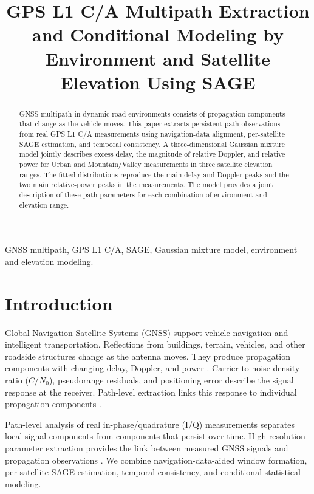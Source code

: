 \documentclass[conference]{IEEEtran}
\title{GPS L1 C/A Multipath Extraction and Conditional Modeling by Environment and Satellite Elevation Using SAGE}
\author{\IEEEauthorblockN{Liang Feng}
\IEEEauthorblockA{Tongji University, Shanghai, China\\2432132@tongji.edu.cn}}
\begin{document}
\maketitle

\begin{abstract}
GNSS multipath in dynamic road environments consists of propagation components that change as the vehicle moves. This paper extracts persistent path observations from real GPS L1 C/A measurements using navigation-data alignment, per-satellite SAGE estimation, and temporal consistency. A three-dimensional Gaussian mixture model jointly describes excess delay, the magnitude of relative Doppler, and relative power for Urban and Mountain/Valley measurements in three satellite elevation ranges. The fitted distributions reproduce the main delay and Doppler peaks and the two main relative-power peaks in the measurements. The model provides a joint description of these path parameters for each combination of environment and elevation range.
\end{abstract}

\begin{IEEEkeywords}
GNSS multipath, GPS L1 C/A, SAGE, Gaussian mixture model, environment and elevation modeling.
\end{IEEEkeywords}

\section{Introduction}
Global Navigation Satellite Systems (GNSS) support vehicle navigation and intelligent transportation. Reflections from buildings, terrain, vehicles, and other roadside structures change as the antenna moves. They produce propagation components with changing delay, Doppler, and power \cite{eissfeller1996gpsdynamic,mora1998multipath,beitler2015cmcd}. Carrier-to-noise-density ratio ($C/N_0$), pseudorange residuals, and positioning error describe the signal response at the receiver. Path-level extraction links this response to individual propagation components \cite{bilich2007snr,xie2011vehicular,beitler2015cmcd}.

Path-level analysis of real in-phase/quadrature (I/Q) measurements separates local signal components from components that persist over time. High-resolution parameter extraction provides the link between measured GNSS signals and propagation observations \cite{fleury1999sage}. We combine navigation-data-aided window formation, per-satellite SAGE estimation, temporal consistency, and conditional statistical modeling.
\end{document}
